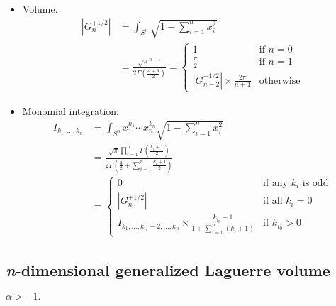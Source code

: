 \documentclass[draft]{scrartcl}
\begin{document}
\begin{itemize}
  \item Volume.
  \[
    \begin{split}
    |G_n^{+1/2}|
      &= \int_{S^n} \sqrt{1 - \sum_{i=1}^n x_i^2}\\
      &= \frac{
        \sqrt{\pi}^{n+1}
      }{
        2\Gamma\left(\frac{n+3}{2}\right)
      }
      = \begin{cases}
        1&\text{if $n=0$}\\
        \frac{\pi}{2}&\text{if $n=1$}\\
        |G_{n-2}^{+1/2}| \times \frac{2\pi}{n+1}&\text{otherwise}
      \end{cases}
  \end{split}
  \]

  \item Monomial integration.
  \[
    \begin{split}
    I_{k_1,\dots,k_n}
      &= \int_{S^n} x_1^{k_1}\cdots x_n^{k_n} \sqrt{1 - \sum_{i=1}^n
      x_i^2}\\
      &= \frac{
        \sqrt{\pi}\prod_{i=1}^n \Gamma\left(\frac{k_i+1}{2}\right)
      }{
        2\Gamma\left(\frac{3}{2} + \sum_{i=1}^n \frac{k_i+1}{2}\right)
      }\\
      &= \begin{cases}
        0&\text{if any $k_i$ is odd}\\
        |G_n^{+1/2}|&\text{if all $k_i=0$}\\
        I_{k_1,\dots,k_{i_0}-2,\dots,k_n} \times \frac{k_{i_0}-1}{1 + \sum_{i=1}^n(k_i+1)}&\text{if $k_{i_0} > 0$}
      \end{cases}
    \end{split}
  \]
\end{itemize}


\subsection*{\textit{n}-dimensional generalized Laguerre volume}

$\alpha > -1.$
\end{document}
